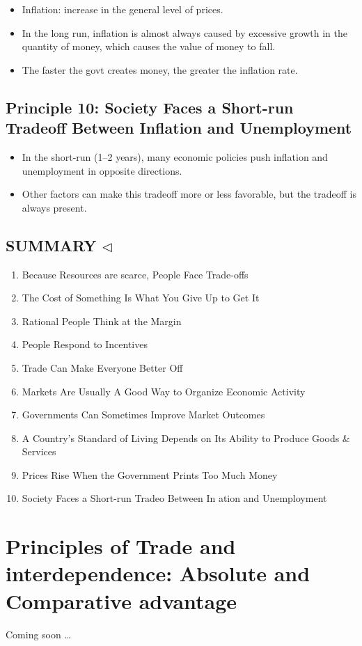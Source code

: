 \documentclass[
]{book}
\providecommand{\tightlist}{%
  \setlength{\itemsep}{0pt}\setlength{\parskip}{0pt}}
\begin{document}
\begin{itemize}
\item
  Inflation: increase in the general level of prices.
\item
  In the long run, inflation is almost always caused by excessive growth in the quantity of money, which causes the value of money to fall.
\item
  The faster the govt creates money, the greater the inflation rate.
\end{itemize}

\hypertarget{society-faces-a-short-run-tradeoff-between-inflation-and-unemployment}{%
\section{\texorpdfstring{\textbf{Principle 10:} Society Faces a Short-run Tradeoff Between Inflation and Unemployment}{ Society Faces a Short-run Tradeoff Between Inflation and Unemployment}}\label{society-faces-a-short-run-tradeoff-between-inflation-and-unemployment}}

\begin{itemize}
\item
  In the short-run (1--2 years), many economic policies push inflation and unemployment in opposite directions.
\item
  Other factors can make this tradeoff more or less favorable, but the tradeoff is always present.
\end{itemize}

\hypertarget{summary-triangleleft}{%
\section{\texorpdfstring{SUMMARY \(\triangleleft\)}{SUMMARY \textbackslash triangleleft}}\label{summary-triangleleft}}

\begin{enumerate}
\def\labelenumi{\arabic{enumi}.}
\tightlist
\item
  Because Resources are scarce, People Face Trade-offs
\item
  The Cost of Something Is What You Give Up to Get It
\item
  Rational People Think at the Margin
\item
  People Respond to Incentives
\item
  Trade Can Make Everyone Better Off
\item
  Markets Are Usually A Good Way to Organize Economic Activity
\item
  Governments Can Sometimes Improve Market Outcomes
\item
  A Country's Standard of Living Depends on Its Ability to Produce Goods \& Services
\item
  Prices Rise When the Government Prints Too Much Money
\item
  Society Faces a Short-run Tradeo Between In ation and Unemployment
\end{enumerate}

\hypertarget{principles-of-trade-and-interdependence-absolute-and-comparative-advantage}{%
\chapter{Principles of Trade and interdependence: Absolute and Comparative advantage}\label{principles-of-trade-and-interdependence-absolute-and-comparative-advantage}}

Coming soon \ldots{}
\end{document}

